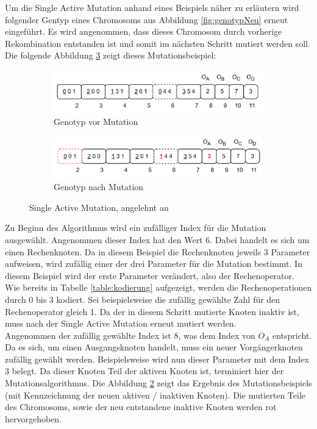 Um die Single Active Mutation anhand eines Beispiels näher zu erläutern wird folgender Gentyp eines Chromosoms aus Abbildung \ref{fig:genotypNeu} erneut eingeführt.
Es wird angenommen, dass dieses Chromosom durch vorherige Rekombination entstanden ist und somit im nächsten Schritt mutiert werden soll.
Die folgende Abbildung \ref{fig:mutationGesamt} zeigt dieses Mutationsbeispiel:

\begin{figure}[H]
	\centering
	\begin{subfigure}[b]{\textwidth}
		\centering
		\includegraphics[scale = 0.55]{Bilder/TorabiBeispielGenotypNeu.png}
		\caption{Genotyp vor Mutation}
		\label{fig:genotypVorMutation}
	\end{subfigure}
	
	\hfill
	
	\begin{subfigure}[b]{\textwidth}
		\centering
		\includegraphics[scale = 0.568]{Bilder/GenotypNachMutation.png}
		\caption{Genotyp nach Mutation}
		\label{fig:genotypNachMutation}
	\end{subfigure}
	\caption{Single Active Mutation, angelehnt an \cite{torabi_using_2022}}
	\label{fig:mutationGesamt}
\end{figure}

Zu Beginn des Algorithmus wird ein zufälliger Index für die Mutation ausgewählt.
Angenommen dieser Index hat den Wert 6.
Dabei handelt es sich um einen Rechenknoten.
Da in diesem Beispiel die Rechenknoten jeweils 3 Parameter aufweisen, wird zufällig einer der drei Parameter für die Mutation bestimmt.
In diesem Beispiel wird der erste Parameter verändert, also der Rechenoperator.
Wie bereits in Tabelle \ref{table:kodierung} aufgezeigt, werden die Rechenoperationen durch 0 bis 3 kodiert.
Sei beispielsweise die zufällig gewählte Zahl für den Rechenoperator gleich 1.
Da der in diesem Schritt mutierte Knoten inaktiv ist, muss nach der Single Active Mutation erneut mutiert werden.\\
Angenommen der zufällig gewählte Index ist 8, was dem Index von $O_A$ entspricht.
Da es sich, um einen Ausgangsknoten handelt, muss ein neuer Vorgängerknoten zufällig gewählt werden.
Beispielsweise wird nun dieser Parameter mit dem Index 3 belegt.
Da dieser Knoten Teil der aktiven Knoten ist, terminiert hier der Mutationsalgorithmus.
Die Abbildung \ref{fig:genotypNachMutation} zeigt das Ergebnis des Mutationsbeispiels (mit Kennzeichnung der neuen aktiven / inaktiven Knoten).
Die mutierten Teile des Chromosoms, sowie der neu entstandene inaktive Knoten werden rot hervorgehoben.


